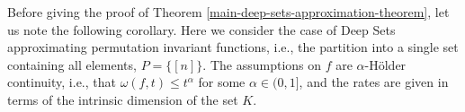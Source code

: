 \documentclass[twoside,11pt]{article}
\newcommand{\nd}[1]{{\color{red}{\bf[Nadav:} 
#1{\bf]}}}
\begin{document}
%    
Before giving the proof of Theorem \ref{main-deep-sets-approximation-theorem}, let us note the following corollary. Here we consider the case of Deep Sets approximating permutation invariant functions, i.e., the partition into a single set containing all elements, $P = \{[n]\} $. The assumptions on $f$ are $\alpha$-H\"older continuity, i.e., that $\omega(f,t) \leq t^\alpha$ for some $\alpha\in (0,1]$, and the rates are given in terms of the intrinsic dimension of the set $K$.
\end{document}
